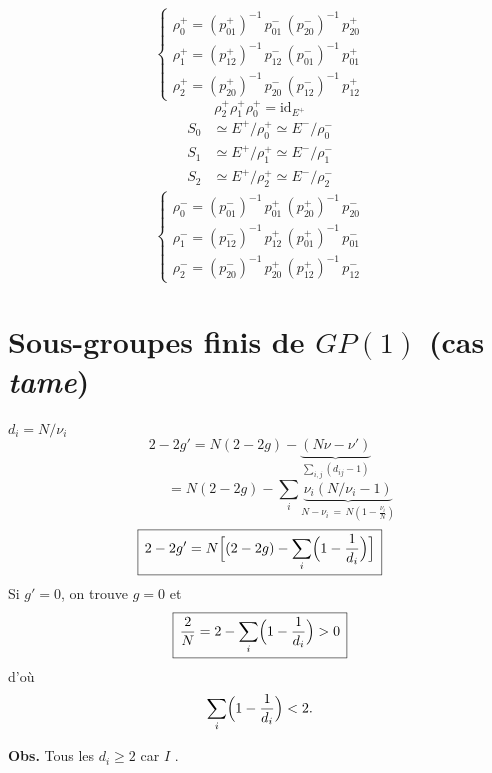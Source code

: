 \documentclass[11pt,a4paper]{article}
\begin{document}
\[
  \begin{cases}
    \rho_0^{+} = (p_{01}^{+})^{-1}\, p_{01}^{-}\, (p_{20}^{-})^{-1}\, p_{20}^{+} \\
    \rho_1^{+} = (p_{12}^{+})^{-1}\, p_{12}^{-}\, (p_{01}^{-})^{-1}\, p_{01}^{+} \\
    \rho_2^{+} = (p_{20}^{+})^{-1}\, p_{20}^{-}\, (p_{12}^{-})^{-1}\, p_{12}^{+}
  \end{cases}
\]
\[
  \rho_2^{+} \rho_1^{+} \rho_0^{+} = \mathrm{id}_{E^{+}}
\]
\[
  \begin{aligned}
    S_0 &\simeq E^{+}/\rho_0^{+} \simeq E^{-}/\rho_0^{-} \\
    S_1 &\simeq E^{+}/\rho_1^{+} \simeq E^{-}/\rho_1^{-} \\
    S_2 &\simeq E^{+}/\rho_2^{+} \simeq E^{-}/\rho_2^{-}
  \end{aligned}
\]
\[
  \begin{cases}
    \rho_0^{-} = (p_{01}^{-})^{-1}\, p_{01}^{+}\, (p_{20}^{+})^{-1}\, p_{20}^{-} \\
    \rho_1^{-} = (p_{12}^{-})^{-1}\, p_{12}^{+}\, (p_{01}^{+})^{-1}\, p_{01}^{-} \\
    \rho_2^{-} = (p_{20}^{-})^{-1}\, p_{20}^{+}\, (p_{12}^{+})^{-1}\, p_{12}^{-}
  \end{cases}
\]

\section{Sous-groupes finis de $GP(1)$ (cas \emph{tame})}

  $d_i = N/\nu_i$
\[
  2 - 2g' = N(2 - 2g) - \underbrace{(N\nu - \nu')}_{\sum_{i,j} (d_{ij} - 1)}
\]
\[
  \phantom{2 - 2g'} = N(2 - 2g) - \sum_i \underbrace{\nu_i (N/\nu_i - 1)}_{N - \nu_i \,=\, N(1 - \frac{\nu_i}{N})}
\]
\[
  \boxed{\,2 - 2g' = N \Bigl[ (2 - 2g) - \sum_i \Bigl(1 - \frac{1}{d_i}\Bigr) \Bigr]\,}
\]
Si $g' = 0$, on trouve $g = 0$ et
\[
  \boxed{\,\frac{2}{N} = 2 - \sum_i \Bigl(1 - \frac{1}{d_i}\Bigr) > 0\,}
\]
d'où
\[
  \sum_i \Bigl(1 - \frac{1}{d_i}\Bigr) < 2 .
\]

\textbf{Obs.} Tous les $d_i \geqslant 2$ \struck{\ill{}} car $I$ 
.
\end{document}
